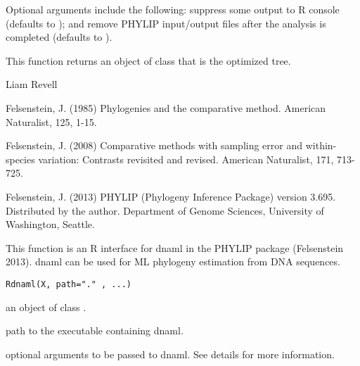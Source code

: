 \documentclass[a4paper]{book}
\begin{document}
%
\begin{Details}\relax
Optional arguments include the following:  suppress some output to R console (defaults to ); and  remove PHYLIP input/output files after the analysis is completed (defaults to ).
\end{Details}
%
\begin{Value}
This function returns an object of class  that is the optimized tree.
\end{Value}
%
\begin{Author}\relax
Liam Revell 
\end{Author}
%
\begin{References}\relax
Felsenstein, J. (1985) Phylogenies and the comparative method. American Naturalist, 125, 1-15.

Felsenstein, J. (2008) Comparative methods with sampling error and within-species variation: Contrasts revisited and revised. American Naturalist, 171, 713-725.

Felsenstein, J. (2013) PHYLIP (Phylogeny Inference Package) version 3.695. Distributed by the author. Department of Genome Sciences, University of Washington, Seattle.
\end{References}
%
\begin{SeeAlso}\relax
{}
\end{SeeAlso}
%
\begin{Description}\relax
This function is an R interface for dnaml in the PHYLIP package (Felsenstein 2013). dnaml can be used for ML phylogeny estimation from DNA sequences.
\end{Description}
%
\begin{Usage}
\begin{verbatim}
Rdnaml(X, path="." , ...)
\end{verbatim}
\end{Usage}
%
\begin{Arguments}
\begin{ldescription}
\item[\code{X}] an object of class .
\item[\code{path}] path to the executable containing dnaml.
\item[\code{...}] optional arguments to be passed to dnaml. See details for more information.
\end{ldescription}
\end{Arguments}
\end{document}
